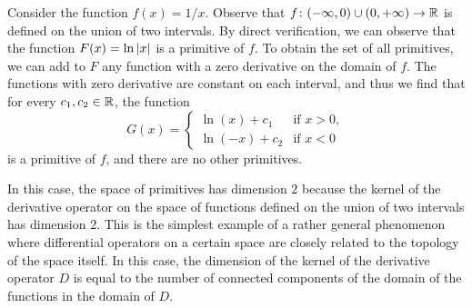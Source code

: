 \begin{example}
\label{ex:primitive_non_connesso}%
\mymark{*}%
Consider the function $f(x) = 1/x$. Observe that
$f\colon (-\infty, 0) \cup (0,+\infty)\to {\mathbb R}$ is defined on the union of two
intervals. By direct verification, we can observe that the function
$F(x) = \ln {\left|x\right|}$ is a primitive of $f$. To obtain the set of all
primitives, we can add to $F$ any function with a zero derivative on the domain
of $f$. The functions with zero derivative are constant on each
interval, and thus we find that for every $c_1, c_2\in {\mathbb R}$, the function
\[
G(x) =
\begin{cases}
  \ln (x) + c_1 &\text{if $x>0$},\\
  \ln (-x) + c_2 & \text{if $x<0$}
\end{cases}
\]
is a primitive of $f$, and there are no other primitives.

In this case, the space of primitives has dimension $2$ because the kernel
of the derivative operator on the space of functions defined on the union of
two intervals has dimension $2$.
This is the simplest example of a rather general phenomenon where differential
operators on a certain space are closely related to the topology of the space
itself. In this case, the dimension of the kernel
of the derivative operator $D$ is equal to the number of connected components of
the domain of the functions in the domain of $D$.
\end{example}